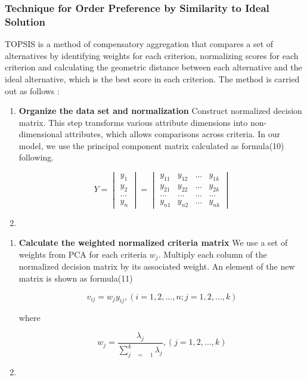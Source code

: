 \documentclass{mcmthesis}
\begin{document}
\begin{enumerate}
        \subsubsection{Technique for Order Preference by Similarity to Ideal Solution}
          TOPSIS is a method of compensatory aggregation that compares a set of alternatives by identifying weights for each criterion, normalizing scores for each criterion and calculating the geometric distance between each alternative and the ideal alternative, which is the best score in each criterion.
          The method is carried out as follows :
        \begin{enumerate}
          \item \textbf{Organize the data set and normalization}
          Construct normalized decision matrix. This step transforms various attribute dimensions into non-dimensional attributes, which allows comparisons across criteria.
          In our model, we use the principal component matrix calculated as formula(10) following.
            \begin{table}[!hbpt]
               \centering
               $$ { Y }=\begin{vmatrix} { y }_{ 1 } \\ { y }_{ 2 } \\ ... \\ { y }_{ n } \end{vmatrix}=\begin{vmatrix} { { y }_{ 11 } } & { y }_{ 12 } & ... & { y }_{ 1k } \\ { y }_{ 21 } & { y }_{ 22 } & ... & { y }_{ 2k } \\ ... & ... & ... & ... \\ { y }_{ n1 } & { y }_{ n2 } & ... & { y }_{ nk } \end{vmatrix} $$
             \end{table}
           \item
           \end{enumerate}

        \begin{enumerate}
          \item \textbf{Calculate the weighted normalized criteria matrix}
          We  use a set of weights from PCA for each criteria $w_{j}$. Multiply each column of the normalized decision matrix by its associated weight. An element of the new matrix is shown as formula(11)
            \begin{table}[!hbpt]
               \centering
               $$ v_{ij} = w_j y_{ij}, (i = 1,2,...,n; j=1,2,...,k) $$
             \end{table}
        where
            \begin{table}[!hbpt]
               \centering
               $$ { w  }_{ j }=\frac { { { \lambda  }_{ j } }  }{ \sum _{ j\quad =\quad 1 }^{ k }{ { \lambda  }_{ j } }  } ,(j =1,2,...,k) $$
             \end{table}
            \item
           \end{enumerate}


\end{enumerate}
\end{document}
